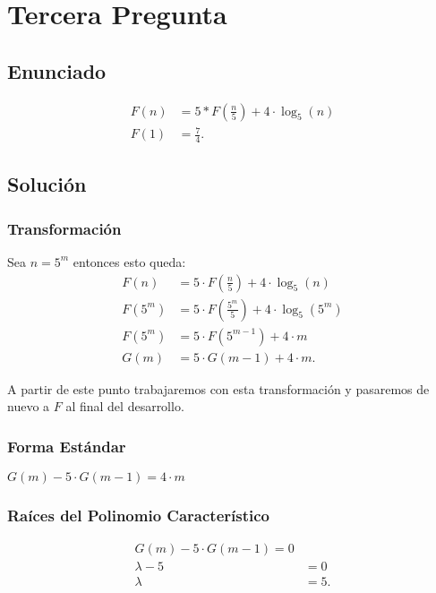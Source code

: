     \section*{Tercera Pregunta}
    \subsection*{Enunciado}
    \begin{align*}
      F\left( n \right) &= 5*F\left( \frac{n}{5} \right) + 4\cdot \log_5\left( n \right)  \\
      F\left( 1 \right) &= \frac{7}{4}
    .\end{align*}
    \subsection*{Solución}
    \subsubsection*{Transformación}
    Sea $n=5^{m}$ entonces esto queda:
    \begin{align*}
      F\left( n \right) &= 5\cdot F\left( \frac{n}{5} \right) + 4\cdot \log_5\left( n \right)  \\
      F\left( 5^{m} \right) &= 5\cdot F\left( \frac{5^{m}}{5} \right) + 4 \cdot \log_5\left( 5^{m} \right)  \\
      F\left( 5^{m} \right) &= 5\cdot F\left( 5^{m - 1} \right) + 4\cdot m \\
      G\left( m \right) &= 5\cdot G\left( m - 1 \right) + 4 \cdot m
    .\end{align*}

    A partir de este punto trabajaremos con esta transformación y pasaremos de nuevo a $F$ al final del desarrollo.

    \subsubsection*{Forma Estándar}
    $G\left( m \right) - 5\cdot G\left( m - 1 \right) = 4\cdot m$
    \subsubsection*{Raíces del Polinomio Característico}
    \begin{align*}
      G\left( m \right) - 5\cdot G\left( m - 1 \right) = 0\\
      \lambda - 5 &= 0 \\
      \lambda &= 5
    .\end{align*}
